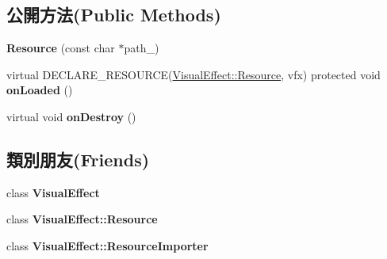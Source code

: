 \subsection*{公開方法(Public Methods)}
\begin{DoxyCompactItemize}
\item 
{\bfseries Resource} (const char $\ast$path\+\_\+)\hypertarget{class_magnum_1_1_visual_effect_1_1_resource_acc74e34cb2fb33d37598019b0ba9bba5}{}\label{class_magnum_1_1_visual_effect_1_1_resource_acc74e34cb2fb33d37598019b0ba9bba5}

\item 
virtual D\+E\+C\+L\+A\+R\+E\+\_\+\+R\+E\+S\+O\+U\+R\+CE(\hyperlink{class_magnum_1_1_visual_effect_1_1_resource}{Visual\+Effect\+::\+Resource}, vfx) protected void {\bfseries on\+Loaded} ()\hypertarget{class_magnum_1_1_visual_effect_1_1_resource_a40357ce505eaf1a57490f944090f8a39}{}\label{class_magnum_1_1_visual_effect_1_1_resource_a40357ce505eaf1a57490f944090f8a39}

\item 
virtual void {\bfseries on\+Destroy} ()\hypertarget{class_magnum_1_1_visual_effect_1_1_resource_abcc591eeb985ac7ba27f16373dd393c6}{}\label{class_magnum_1_1_visual_effect_1_1_resource_abcc591eeb985ac7ba27f16373dd393c6}

\end{DoxyCompactItemize}
\subsection*{類別朋友(Friends)}
\begin{DoxyCompactItemize}
\item 
class {\bfseries Visual\+Effect}\hypertarget{class_magnum_1_1_visual_effect_1_1_resource_ad19546ee8a8868c73e6f88564fb88462}{}\label{class_magnum_1_1_visual_effect_1_1_resource_ad19546ee8a8868c73e6f88564fb88462}

\item 
class {\bfseries Visual\+Effect\+::\+Resource}\hypertarget{class_magnum_1_1_visual_effect_1_1_resource_a7e5f0c0359cb7300a876070f845cb939}{}\label{class_magnum_1_1_visual_effect_1_1_resource_a7e5f0c0359cb7300a876070f845cb939}

\item 
class {\bfseries Visual\+Effect\+::\+Resource\+Importer}\hypertarget{class_magnum_1_1_visual_effect_1_1_resource_a316a2d14e00fb787148dd7c1f760c78c}{}\label{class_magnum_1_1_visual_effect_1_1_resource_a316a2d14e00fb787148dd7c1f760c78c}

\end{DoxyCompactItemize}
